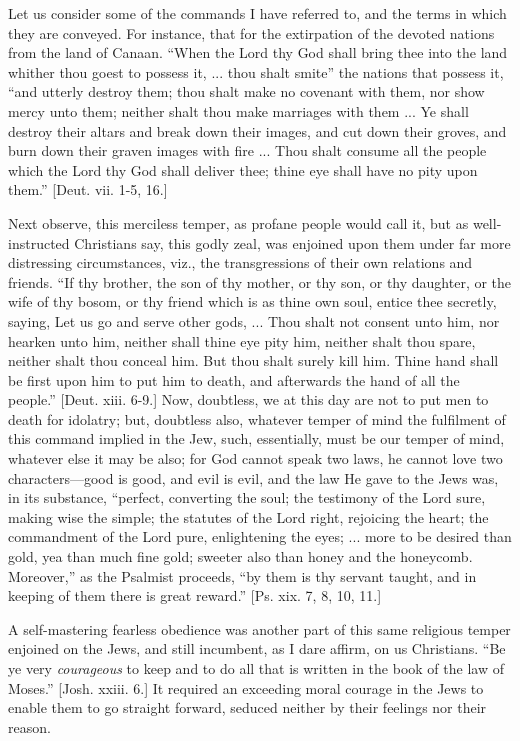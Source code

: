 Let us consider some of the commands I have referred to, and the
terms in which they are conveyed. For instance, that for the
extirpation of the devoted nations from the land of Canaan. ``When
the Lord thy God shall bring thee into the land whither thou goest to
possess it, ... thou shalt smite'' the nations that possess it,
``and utterly destroy them; thou shalt make no covenant with them,
nor show mercy unto them; neither shalt thou make marriages with them
... Ye shall destroy their altars and break down their images, and cut
down their groves, and burn down their graven images with fire ...
Thou shalt consume all the people which the Lord thy God shall deliver
thee; thine eye shall have no pity upon them.'' [Deut. vii. 1-5,
16.]

Next observe, this merciless temper, as profane people would call
it, but as well-instructed Christians say, this godly zeal, was
enjoined upon them under far more distressing circumstances, viz., the
transgressions of their own relations and friends. ``If thy
brother, the son of thy mother, or thy son, or thy daughter, or the
wife of thy bosom, or thy friend which is as thine own soul, entice
thee secretly, saying, Let us go and serve other gods, ... Thou shalt
not consent unto him, nor hearken unto him, neither shall thine eye
pity him, neither shalt thou spare, neither shalt thou conceal
him. But thou shalt surely kill him. Thine hand shall be first upon
him to put him to death, and afterwards the hand of all the
people.'' [Deut. xiii. 6-9.] Now, doubtless, we at this day are
not to put men to death for idolatry; but, doubtless also, whatever
temper of mind the fulfilment of this command implied in the Jew,
such, essentially, must be our temper of mind, whatever else it may be
also; for God cannot speak two laws, he cannot love two characters—good
is good, and evil is evil, and the law He gave to the Jews was, in its
substance, ``perfect, converting the soul; the testimony of the
Lord sure, making wise the simple; the statutes of the Lord right,
rejoicing the heart; the commandment of the Lord pure, enlightening
the eyes; ... more to be desired than gold, yea than much fine gold;
sweeter also than honey and the honeycomb. Moreover,'' as the
Psalmist proceeds, ``by them is thy servant taught, and in keeping
of them there is great reward.'' [Ps. xix. 7, 8, 10, 11.]

A self-mastering fearless obedience was another part of this same
religious temper enjoined on the Jews, and still incumbent, as I dare
affirm, on us Christians. ``Be ye very \emph{courageous} to keep
and to do all that is written in the book of the law of Moses.''
[Josh. xxiii. 6.] It required an exceeding moral courage in the Jews
to enable them to go straight forward, seduced neither by their
feelings nor their reason.

